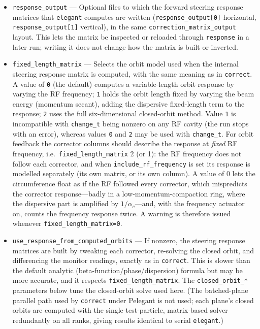 \documentclass[11pt]{article}
\begin{document}
\begin{itemize}
\item \verb|response_output| --- Optional files to which the forward steering response matrices
  that \verb|elegant| computes are written (\verb|response_output[0]| horizontal,
  \verb|response_output[1]| vertical), in the same \verb|correction_matrix_output| layout.  This
  lets the matrix be inspected or reloaded through \verb|response| in a later run; writing it
  does not change how the matrix is built or inverted.
\item \verb|fixed_length_matrix| --- Selects the orbit model used when the internal
  steering response matrix is computed, with the same meaning as in \verb|correct|.  A value
  of \verb|0| (the default) computes a variable-length orbit response by varying the RF
  frequency; \verb|1| holds the orbit length fixed by varying the beam energy (momentum
  secant), adding the dispersive fixed-length term to the response; \verb|2| uses the full
  six-dimensional closed-orbit method.  Value \verb|1| is incompatible with \verb|change_t|
  being nonzero on any RF cavity (the run stops with an error), whereas values \verb|0| and
  \verb|2| may be used with \verb|change_t|.  For orbit feedback the corrector columns should
  describe the response at \emph{fixed} RF frequency, i.e.\ \verb|fixed_length_matrix| 2 (or 1):
  the RF frequency does not follow each corrector, and when \verb|include_rf_frequency| is set its
  response is modelled separately (its own matrix, or its own column).  A value of 0 lets the
  circumference float as if the RF followed every corrector, which mispredicts the corrector
  response---badly in a low-momentum-compaction ring, where the dispersive part is amplified by
  $1/\alpha_c$---and, with the frequency actuator on, counts the frequency response twice.  A
  warning is therefore issued whenever \verb|fixed_length_matrix=0|.
\item \verb|use_response_from_computed_orbits| --- If nonzero, the steering response matrices
  are built by tweaking each corrector, re-solving the closed orbit, and differencing the
  monitor readings, exactly as in \verb|correct|.  This is slower than the default analytic
  (beta-function/phase/dispersion) formula but may be more accurate, and it respects
  \verb|fixed_length_matrix|.  The \verb|closed_orbit_*| parameters below tune the closed-orbit
  solve used here.  (The batched-plane parallel path used by \verb|correct| under Pelegant is
  not used; each plane's closed orbits are computed with the single-test-particle, matrix-based
  solver redundantly on all ranks, giving results identical to serial \verb|elegant|.)

\end{itemize}
\end{document}
